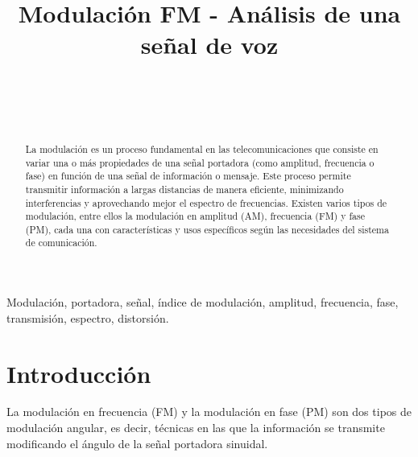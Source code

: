 \documentclass[conference]{IEEEtran}
\begin{document}
	
	\title{Modulación FM - Análisis de una señal de voz}
	\author{
		\\
		\\
		\\
		\and
		\and
		\and
	}
	
	\maketitle
	\begin{abstract}
		La modulación es un proceso fundamental en las telecomunicaciones que consiste en variar una o más propiedades de una señal portadora (como amplitud, frecuencia o fase) en función de una señal de información o mensaje. Este proceso permite transmitir información a largas distancias de manera eficiente, minimizando interferencias y aprovechando mejor el espectro de frecuencias. Existen varios tipos de modulación, entre ellos la modulación en amplitud (AM), frecuencia (FM) y fase (PM), cada una con características y usos específicos según las necesidades del sistema de comunicación.
		
	\end{abstract}
	
	\begin{IEEEkeywords}
		Modulación, portadora, señal, índice de modulación, amplitud, frecuencia, fase, transmisión, espectro, distorsión.
	\end{IEEEkeywords}
	
	\section{Introducción}
	La modulación en frecuencia (FM) y la modulación en fase (PM) son dos tipos de modulación angular, es decir, técnicas en las que la información se transmite modificando el ángulo de la señal portadora sinuidal. 
	
\end{document}
